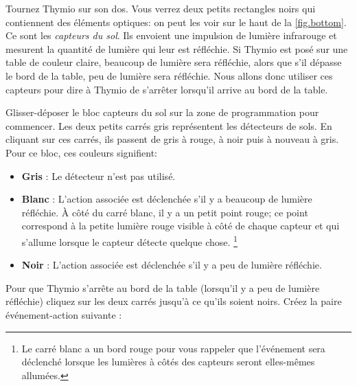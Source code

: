 
Tournez Thymio sur son dos.
Vous verrez deux petits rectangles noirs qui contiennent des éléments optiques: on peut les voir sur le haut de la \cref{fig.bottom}.
Ce sont les \emph{capteurs du sol}.
Ils envoient une impulsion de lumière infrarouge et mesurent la quantité de lumière qui leur est réfléchie.
Si Thymio est posé sur une table de couleur claire, beaucoup de lumière sera réfléchie, alors que s'il dépasse le bord de la table, peu de lumière sera réfléchie.
Nous allons donc utiliser ces capteurs pour dire à Thymio de s'arrêter lorsqu'il arrive au bord de la table.


Glisser-déposer le bloc capteurs du sol  sur la zone de programmation pour commencer.
Les deux petits carrés gris représentent les détecteurs de sols.
En cliquant sur ces carrés, ils passent de gris à rouge, à noir puis à nouveau à gris.
Pour ce bloc, ces couleurs signifient:

\begin{itemize}

\item \textbf{Gris} : Le détecteur n'est pas utilisé.

\item \textbf{Blanc} : L'action associée est déclenchée s'il y a beaucoup de lumière réfléchie.\label{p.proximity-colors1}
À côté du carré blanc, il y a un petit point rouge;
ce point correspond à la petite lumière rouge visible à côté de chaque capteur et qui s'allume lorsque le capteur détecte quelque chose.
\footnote{Le carré blanc a un bord rouge pour vous rappeler que l'événement sera déclenché lorsque les lumières à côtés des capteurs seront elles-mêmes allumées.}
\item \textbf{Noir} : L'action associée est déclenchée s'il y a peu de lumière réfléchie.
\end{itemize}

Pour que Thymio s'arrête au bord de la table (lorsqu'il y a peu de lumière réfléchie) cliquez sur les deux carrés jusqu'à ce qu'ils soient noirs.
Créez la paire événement-action suivante : 

